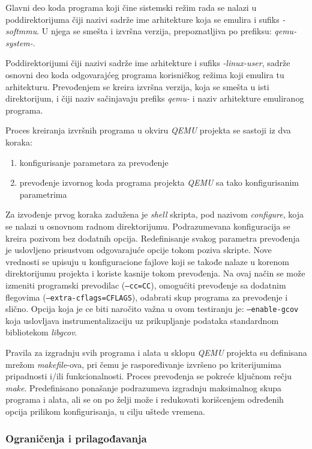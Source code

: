 \documentclass[12pt,oneside]{memoir}
\newcommand{\kod}[1]{\texttt{#1}}
\newcommand{\strano}[1]{\textit{#1}}
\begin{document}
Glavni deo koda programa koji čine sistemski režim rada se nalazi u poddirektorijuma čiji nazivi sadrže ime arhitekture koja se emulira i sufiks \strano{-softmmu}. U njega se smešta i izvršna verzija, prepoznatljiva po prefiksu: \strano{qemu-system-}.

Poddirektorijumi čiji nazivi sadrže ime arhitekture i sufiks \strano{-linux-user}, sadrže osnovni deo koda odgovarajćeg programa korisničkog režima koji emulira tu arhitekturu. Prevođenjem se kreira izvršna verzija, koja se smešta u isti direktorijum, i čiji naziv sačinjavaju prefiks \strano{qemu-} i naziv arhitekture emuliranog programa.

Proces kreiranja izvršnih programa u okviru \strano{QEMU} projekta se sastoji iz dva koraka:
\begin{enumerate}
\item konfigurisanje parametara za prevođenje
\item prevođenje izvornog koda programa projekta \strano{QEMU} sa tako konfigurisanim parametrima
\end{enumerate}
Za izvođenje prvog koraka zadužena je \strano{shell} skripta, pod nazivom \strano{configure}, koja se nalazi u osnovnom radnom direktorijumu. Podrazumevana konfiguracija se kreira pozivom bez dodatnih opcija. Redefinisanje svakog parametra prevođenja je uslovljeno prisustvom odgovarajuće opcije tokom poziva skripte. Nove vrednosti se upisuju u konfiguracione fajlove koji se takođe nalaze u korenom direktorijumu projekta i koriste kasnije tokom prevođenja. Na ovaj način se može izmeniti programski prevodilac (\kod{--cc=CC}), omogućiti prevođenje sa dodatnim flegovima (\kod{--extra-cflags=CFLAGS}), odabrati skup programa za prevođenje i slično. Opcija koja je ce biti naročito važna u ovom testiranju je: \kod{--enable-gcov} koja uslovljava instrumentalizaciju uz prikupljanje podataka standardnom bibliotekom \strano{libgcov}.

Pravila za izgradnju svih programa i alata u sklopu \strano{QEMU} projekta su definisana mrežom \strano{makefile}-ova, pri čemu je raspoređivanje izvršeno po kriterijumima pripadnosti i/ili funkcionalnosti. Proces prevođenja se pokreće ključnom rečju \strano{make}. Predefinisano ponašanje podrazumeva izgradnju maksimalnog skupa programa i alata, ali se on po želji može i redukovati korišcenjem određenih opcija prilikom konfigurisanja, u cilju uštede vremena.

\subsubsection{Ograničenja i prilagođavanja}
\end{document}
